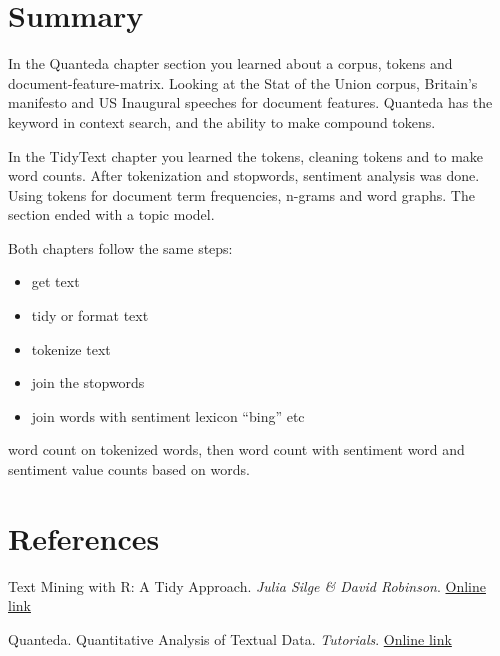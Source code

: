 \documentclass[
  letterpaper,
  DIV=11,
  numbers=noendperiod]{scrreprt}
\providecommand{\tightlist}{%
  \setlength{\itemsep}{0pt}\setlength{\parskip}{0pt}}\usepackage{longtable,booktabs,array}
\newlength{\cslhangindent}
\newlength{\cslentryspacingunit} %
\newenvironment{CSLReferences}[2] %
 {%
  \setlength{\parindent}{0pt}
  \ifodd #1
  \let\oldpar\par
  \def\par{\hangindent=\cslhangindent\oldpar}
  \fi
  \setlength{\parskip}{#2\cslentryspacingunit}
 }%
 {}
\begin{document}

\hypertarget{summary}{%
\chapter{Summary}\label{summary}}

In the Quanteda chapter section you learned about a corpus, tokens and
document-feature-matrix. Looking at the Stat of the Union corpus,
Britain's manifesto and US Inaugural speeches for document features.
Quanteda has the keyword in context search, and the ability to make
compound tokens.

In the TidyText chapter you learned the tokens, cleaning tokens and to
make word counts. After tokenization and stopwords, sentiment analysis
was done. Using tokens for document term frequencies, n-grams and word
graphs. The section ended with a topic model.

Both chapters follow the same steps:

\begin{itemize}
\tightlist
\item
  get text
\item
  tidy or format text
\item
  tokenize text
\item
  join the stopwords
\item
  join words with sentiment lexicon ``bing'' etc
\end{itemize}

word count on tokenized words, then word count with sentiment word and
sentiment value counts based on words.


\hypertarget{references}{%
\chapter*{References}\label{references}}

\hypertarget{refs}{}
\begin{CSLReferences}{0}{0}
\end{CSLReferences}

Text Mining with R: A Tidy Approach. \emph{Julia Silge \& David
Robinson}. \href{https://www.tidytextmining.com/index.html}{Online link}

Quanteda. Quantitative Analysis of Textual Data. \emph{Tutorials}.
\href{https://tutorials.quanteda.io/introduction/}{Online link}
\end{document}
